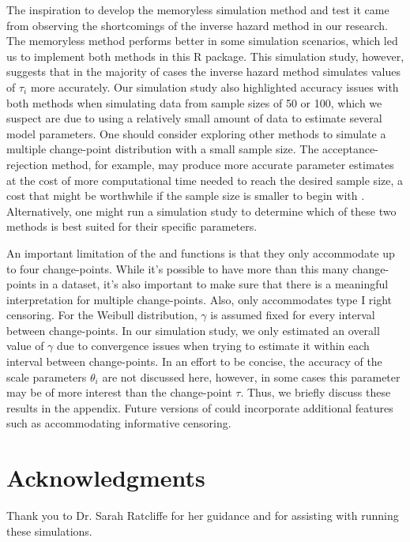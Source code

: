 The inspiration to develop the memoryless simulation method and test it came from observing the shortcomings of the inverse hazard method in our research. The memoryless method performs better in some simulation scenarios, which led us to implement both methods in this R package. This simulation study, however, suggests that in the majority of cases the inverse hazard method simulates values of $\tau_i$ more accurately. Our simulation study also highlighted accuracy issues with both methods when simulating data from sample sizes of 50 or 100, which we suspect are due to using a relatively small amount of data to estimate several model parameters. One should consider exploring other methods to simulate a multiple change-point distribution with a small sample size. The acceptance-rejection method, for example, may produce more accurate parameter estimates at the cost of more computational time needed to reach the desired sample size, a cost that might be worthwhile if the sample size is smaller to begin with \citep{StatComp}. Alternatively, one might run a simulation study to determine which of these two methods is best suited for their specific parameters.

An important limitation of the  and  functions is that they only accommodate up to four change-points. While it's possible to have more than this many change-points in a dataset, it's also important to make sure that there is a meaningful interpretation for multiple change-points. Also,  only accommodates type I right censoring. For the Weibull distribution, $\gamma$ is assumed fixed for every interval between change-points. In our simulation study, we only estimated an overall value of $\gamma$ due to convergence issues when trying to estimate it within each interval between change-points. In an effort to be concise, the accuracy of the scale parameters $\theta_i$ are not discussed here, however, in some cases this parameter may be of more interest than the change-point $\tau$. Thus, we briefly discuss these results in the appendix. Future versions of  could incorporate additional features such as accommodating informative censoring. 

\section{Acknowledgments}
Thank you to Dr. Sarah Ratcliffe for her guidance and for assisting with running these simulations.

